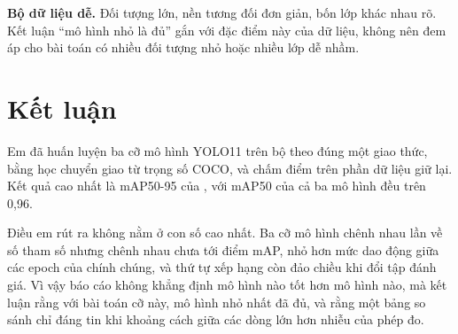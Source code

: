 \documentclass[11pt,a4paper]{article}
\begin{document}
\textbf{Bộ dữ liệu dễ.} Đối tượng lớn, nền tương đối đơn giản, bốn lớp khác nhau rõ. Kết luận
``mô hình nhỏ là đủ'' gắn với đặc điểm này của dữ liệu, không nên đem áp cho bài toán có nhiều đối
tượng nhỏ hoặc nhiều lớp dễ nhầm.

\section{Kết luận}

Em đã huấn luyện ba cỡ mô hình YOLO11 trên bộ \dataname{} theo đúng một giao thức, bằng học chuyển
giao từ trọng số COCO, và chấm điểm trên phần dữ liệu giữ lại. Kết quả cao nhất là mAP50-95
\besttestmap{} của \besttest{}, với mAP50 của cả ba mô hình đều trên 0,96.

Điều em rút ra không nằm ở con số cao nhất. Ba cỡ mô hình chênh nhau \paramratio{} lần về số tham
số nhưng chênh nhau chưa tới \testspread{} điểm mAP, nhỏ hơn mức dao động giữa các epoch của chính
chúng, và thứ tự xếp hạng còn đảo chiều khi đổi tập đánh giá. Vì vậy báo cáo không khẳng định mô
hình nào tốt hơn mô hình nào, mà kết luận rằng với bài toán cỡ này, mô hình nhỏ nhất đã đủ, và
rằng một bảng so sánh chỉ đáng tin khi khoảng cách giữa các dòng lớn hơn nhiễu của phép đo.
\end{document}
